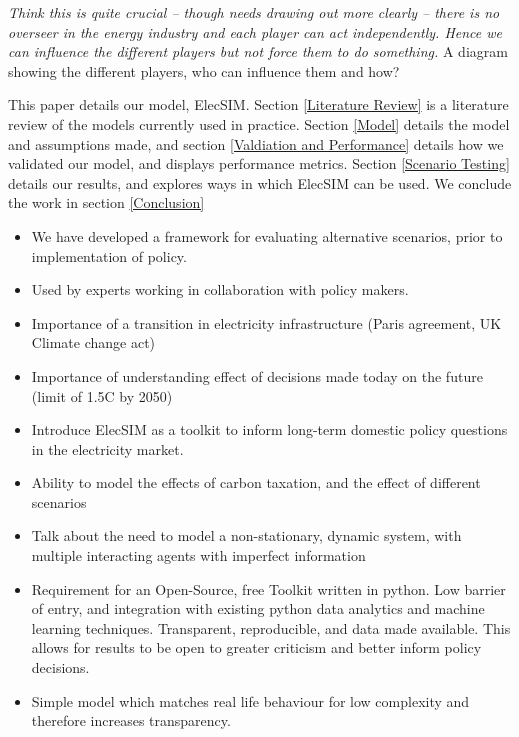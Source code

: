  {\color{red} \textit{Think this is quite crucial -- though needs drawing out more clearly -- there is no overseer in the energy industry and each player can act independently. Hence we can influence the different players but not force them to do something.} A diagram showing the different players, who can influence them and how?}

This paper details our model, ElecSIM. Section \ref{Literature Review} is a literature review of the models currently used in practice. Section \ref{Model} details the model and assumptions made, and section \ref{Valdiation and Performance} details how we validated our model, and displays performance metrics. Section \ref{Scenario Testing} details our results, and explores ways in which ElecSIM can be used. We conclude the work in section \ref{Conclusion}
 

\begin{itemize}
	\item We have developed a framework for evaluating alternative scenarios, prior to implementation of policy.
	\item Used by experts working in collaboration with policy makers.
	\item Importance of a transition in electricity infrastructure (Paris agreement, UK Climate change act)
	\item Importance of understanding effect of decisions made today on the future (limit of 1.5C by 2050)
	\item Introduce ElecSIM as a toolkit to inform long-term domestic policy questions in the electricity market. 
	\item Ability to model the effects of carbon taxation, and the effect of different scenarios 
	\item Talk about the need to model a non-stationary, dynamic system, with multiple interacting agents with imperfect information
	\item Requirement for an Open-Source, free Toolkit written in python. Low barrier of entry, and integration with existing python data analytics and machine learning techniques. Transparent, reproducible, and data made available. This allows for results to be open to greater criticism and better inform policy decisions.
	\item Simple model which matches real life behaviour for low complexity and therefore increases transparency.
\end{itemize}

